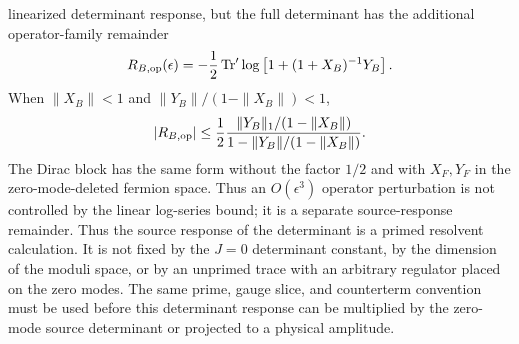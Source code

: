 \begin{controlledapproximation}
linearized determinant response, but the full determinant has the additional
operator-family remainder
\[
  R_{B,{\rm op}}(\epsilon)
  =
  -\frac12
  \operatorname{Tr}'\log
  \left[
    1+(1+X_B)^{-1}Y_B
  \right].
\]
When
\(\|X_B\|<1\) and \(\|Y_B\|/(1-\|X_B\|)<1\),
\[
  |R_{B,{\rm op}}|
  \le
  \frac12
  \frac{\|Y_B\|_1/(1-\|X_B\|)}
       {1-\|Y_B\|/(1-\|X_B\|)} .
\]
The Dirac block has the same form without the factor \(1/2\) and with
\(X_F,Y_F\) in the zero-mode-deleted fermion space.  Thus an \(O(\epsilon^3)\)
operator perturbation is not controlled by the linear log-series bound; it is
a separate source-response remainder.
Thus the source response of the determinant is a primed resolvent
calculation.  It is not fixed by the \(J=0\) determinant constant, by the
dimension of the moduli space, or by an unprimed trace with an arbitrary
regulator placed on the zero modes.  The same prime, gauge slice, and
counterterm convention must be used before this determinant response can be
multiplied by the zero-mode source determinant or projected to a physical
amplitude.
\end{controlledapproximation}

